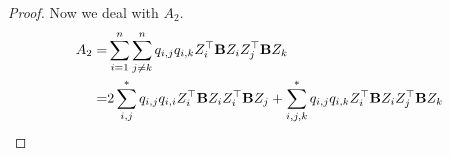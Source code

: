 \documentclass[11pt]{article}
\theoremstyle{plain}
\theoremstyle{definition}
\theoremstyle{remark}
\begin{document}
\begin{proof}
Now we deal with $A_2$.
\begin{equation*}
    \begin{split}
        A_2=&
        \sum_{i=1}^n \sum_{j\neq k}^n q_{i,j} q_{i,k} Z_i^\top \mathbf{B} Z_i Z_j^\top \mathbf{B} Z_k
        \\
    =&
    2\sum_{i,j}^* q_{i,j} q_{i,i} Z_i^\top \mathbf{B} Z_i Z_i^\top \mathbf{B} Z_j
        +
        \sum_{i,j,k}^*  q_{i,j} q_{i,k} Z_i^\top \mathbf{B} Z_i Z_j^\top \mathbf{B} Z_k
\end{split} 
\end{equation*}

\end{proof}








\end{document}
